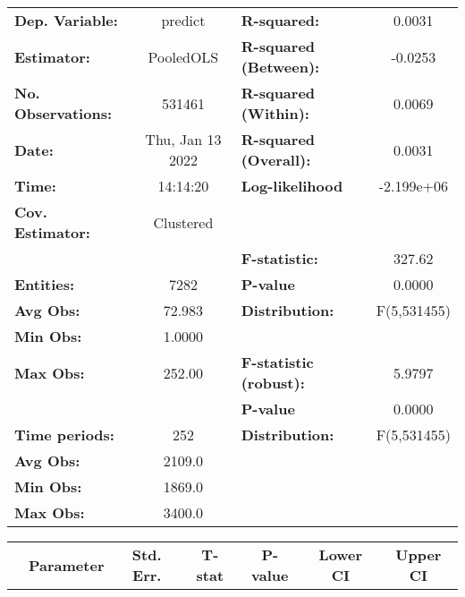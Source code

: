\begin{center}
\begin{tabular}{lclc}
\toprule
\textbf{Dep. Variable:}    &      predict       & \textbf{  R-squared:         }   &      0.0031      \\
\textbf{Estimator:}        &     PooledOLS      & \textbf{  R-squared (Between):}  &     -0.0253      \\
\textbf{No. Observations:} &       531461       & \textbf{  R-squared (Within):}   &      0.0069      \\
\textbf{Date:}             &  Thu, Jan 13 2022  & \textbf{  R-squared (Overall):}  &      0.0031      \\
\textbf{Time:}             &      14:14:20      & \textbf{  Log-likelihood     }   &    -2.199e+06    \\
\textbf{Cov. Estimator:}   &     Clustered      & \textbf{                     }   &                  \\
\textbf{}                  &                    & \textbf{  F-statistic:       }   &      327.62      \\
\textbf{Entities:}         &        7282        & \textbf{  P-value            }   &      0.0000      \\
\textbf{Avg Obs:}          &       72.983       & \textbf{  Distribution:      }   &   F(5,531455)    \\
\textbf{Min Obs:}          &       1.0000       & \textbf{                     }   &                  \\
\textbf{Max Obs:}          &       252.00       & \textbf{  F-statistic (robust):} &      5.9797      \\
\textbf{}                  &                    & \textbf{  P-value            }   &      0.0000      \\
\textbf{Time periods:}     &        252         & \textbf{  Distribution:      }   &   F(5,531455)    \\
\textbf{Avg Obs:}          &       2109.0       & \textbf{                     }   &                  \\
\textbf{Min Obs:}          &       1869.0       & \textbf{                     }   &                  \\
\textbf{Max Obs:}          &       3400.0       & \textbf{                     }   &                  \\
\bottomrule
\end{tabular}
\begin{tabular}{lcccccc}
                & \textbf{Parameter} & \textbf{Std. Err.} & \textbf{T-stat} & \textbf{P-value} & \textbf{Lower CI} & \textbf{Upper CI}  \\

\end{tabular}
\end{center}
